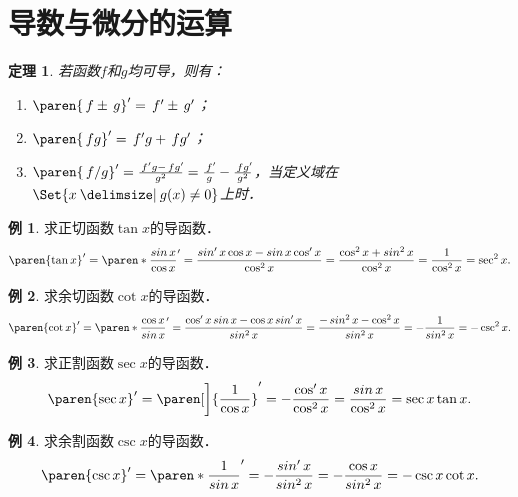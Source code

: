 \documentclass[a4paper,punct=CCT]{ctexbook}
\renewcommand*{\enumparen}[1]{（\makebox[0.6em][c]{\normalfont#1}）}
\newtheorem*{theorem*}{定理}
\theoremstyle{definition}
\newtheorem*{example*}{例}
\theoremstyle{remark}
\begin{document}
\section{导数与微分的运算}

\begin{theorem*}
  \label{thm:deriv4ops}
  若函数\(f\)和\(g\)均可导，则有：
  \begin{enumerate}
    \renewcommand{\labelenumi}{\enumparen{\arabic{enumi}}}
  \item \(\paren{\,f \pm \,g}' = \,f' \pm \,g'\)；
  \item \(\paren{\,fg}' = \,f'g + \,fg'\)；
  \item \(\paren{\,f/g}' = \frac{\,f'g - \,fg'\!}{g^2} = \frac{\,f'\!}{g} - \frac{\,fg'\!}{g^2}\)，当定义域在\(\Set{x \mid g(x) \ne 0}\)上时．
  \end{enumerate}
\end{theorem*}

\begin{example*}
  求正切函数\(\tan x\)的导函数．
  \begin{equation*}
    \paren{\tan x}'
    = \paren*{\frac{\sin x}{\cos x}}'
    = \frac{\sin' x \cos x - \sin x \cos' x}{\cos^2 x}
    = \frac{\cos^2 x + \sin^2 x}{\cos^2 x}
    = \frac{1}{\cos^2 x}
    = \sec^2 x.
  \end{equation*}
\end{example*}

\begin{example*}
  求余切函数\(\cot x\)的导函数．
  \begin{equation*}
    \paren{\cot x}'
    = \paren*{\frac{\cos x}{\sin x}}'
    = \frac{\cos' x \sin x - \cos x \sin' x}{\sin^2 x}
    = \frac{-\sin^2 x - \cos^2 x}{\sin^2 x}
    = -\frac{1}{\sin^2 x}
    = -\csc^2 x.
  \end{equation*}
\end{example*}

\begin{example*}
  求正割函数\(\sec x\)的导函数．
  \begin{equation*}
    \paren{\sec x}'
    = \paren[\bigg]{\frac{1}{\cos x}}'
    = -\frac{\cos' x}{\cos^2 x}
    = \frac{\sin x}{\cos^2 x}
    = \sec x \tan x.
  \end{equation*}
\end{example*}

\begin{example*}
  求余割函数\(\csc x\)的导函数．
  \begin{equation*}
    \paren{\csc x}'
    = \paren*{\frac{1}{\sin x}}'
    = -\frac{\sin' x}{\sin^2 x}
    = -\frac{\cos x}{\sin^2 x}
    = -\csc x \cot x.
  \end{equation*}
\end{example*}
\end{document}
